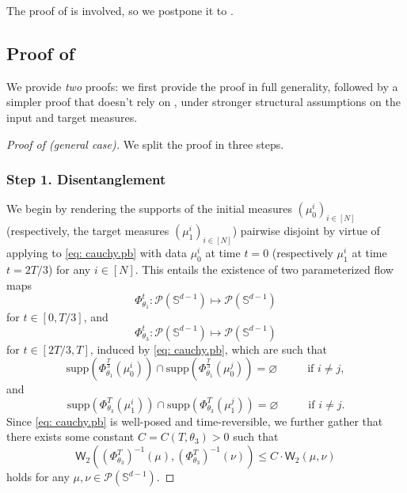 \documentclass[a4paper,11pt]{article}
\theoremstyle{plain}
\newcommand{\supp}{\mathrm{supp}}
\renewcommand{\S}{\mathbb{S}^{d-1}}
\renewcommand{\leq}{\leqslant}
\numberwithin{equation}{section}
\begin{document}
The proof of  is involved, so we postpone it to {\bf {}}.


\subsection{\texorpdfstring{Proof of }{Proof of Theorem}}

We provide \emph{two} proofs: we first provide the proof in full generality, followed by a simpler proof that doesn't rely on , under stronger structural assumptions on the input and target measures.


\begin{proof}[Proof of  (general case)]

We split the proof in three steps.

\subsubsection*{Step 1. Disentanglement} 

We begin by rendering the supports of the initial measures $(\mu_0^i)_{i\in[N]}$ (respectively, the target measures $(\mu_1^i)_{i\in[N]}$) pairwise disjoint by virtue of applying  to \eqref{eq: cauchy.pb} with data $\mu_0^i$ at time $t=0$ (respectively $\mu_1^i$ at time $t=2T/3$) for any $i\in[N]$. 
This entails the existence of two parameterized flow maps
\begin{equation*}
    \Phi_{\theta_1}^{t}:\mathscr{P}(\S)\mapsto \mathscr{P}(\S)
\end{equation*}
for $t\in[0,T/3]$, and
\begin{equation*}
    \Phi_{\theta_3}^{t}:\mathscr{P}(\S)\mapsto \mathscr{P}(\S)
\end{equation*}
for $t\in[2T/3, T]$, induced by \eqref{eq: cauchy.pb}, which are such that
\begin{equation*}
    \supp\left(\Phi_{\theta_1}^{\frac{T}{3}}(\mu_0^i)\right)\cap \supp\left(\Phi_{\theta_1}^{\frac{T}{3}}(\mu_0^j)\right)=\varnothing\hspace{1cm}\text{ if }i\neq j,
\end{equation*}
and 
\begin{equation*}
    \supp\left(\Phi_{\theta_3}^{T}(\mu_1^i)\right)\cap \supp\left(\Phi_{\theta_3}^{T}(\mu_1^j)\right)=\varnothing\hspace{1cm}\text{ if }i\neq j.
\end{equation*}
Since \eqref{eq: cauchy.pb} is well-posed and time-reversible, %
we further gather that there exists some constant $C=C(T,\theta_3)>0$ such that
\begin{equation} \label{eq: continuity.inverse.flow}
\mathsf{W}_2\left(\left(\Phi_{\theta_3}^{T}\right)^{-1}(\mu),\left(\Phi_{\theta_3}^{T}\right)^{-1}(\nu)\right)\leq C\cdot\mathsf{W}_{2}(\mu,\nu)
\end{equation}
holds for any $\mu,\nu\in \mathscr{P}(\S)$.



\end{proof}
\end{document}
